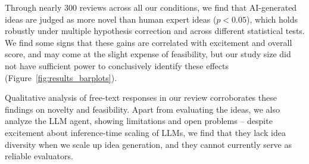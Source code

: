 




Through nearly 300 reviews across all our conditions, we find that AI-generated ideas
are judged as more novel than human expert ideas ($p < 0.05$), which holds robustly under multiple hypothesis correction and across different statistical tests. 
We find some signs that these gains are correlated with excitement and overall score, and may come at the slight expense of feasibility, but our study size did not have sufficient power to conclusively identify these effects (Figure~\ref{fig:results_barplots}).

Qualitative analysis of free-text responses in our review corroborates these findings on novelty and feasibility. 
Apart from evaluating the ideas, we also analyze the LLM agent, showing limitations and open problems -- despite excitement about inference-time scaling of LLMs, we find that they lack idea diversity when we scale up idea generation, and they cannot currently serve as reliable evaluators.

 

